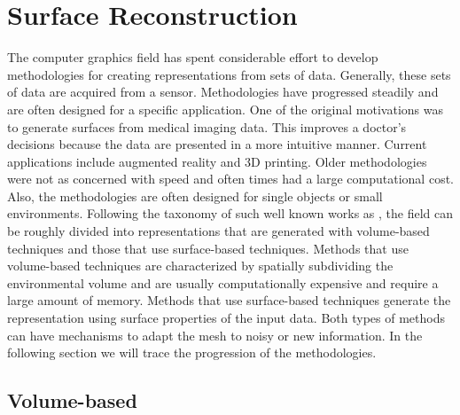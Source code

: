 \section{Surface Reconstruction}
\label{section:surface_reconstruction}

The computer graphics field has spent considerable effort to develop
methodologies for creating representations from sets of data. Generally, these
sets of data are acquired from a sensor. Methodologies have progressed steadily
and are often designed for a specific application. One of the original
motivations was to generate surfaces from medical imaging data. This improves a
doctor's  decisions because the data are presented in a more intuitive manner.
Current applications include augmented reality and 3D printing. Older
methodologies were not as concerned with speed and often times had a large
computational cost. Also, the methodologies are often designed for single
objects or small environments. Following the taxonomy of such well known works
as \cite{Gopi2002,Mencl1997}, the field can be roughly divided into
representations that are generated with volume-based techniques and those that
use surface-based techniques. Methods that use volume-based techniques are
characterized by spatially subdividing the environmental volume and are usually
computationally expensive and require a large amount of memory. Methods that use
surface-based techniques generate the representation using surface properties of
the input data. Both types of methods can have mechanisms to adapt the mesh to
noisy or new information. In the following section we will trace the progression
of the methodologies.

\subsection{Volume-based}

